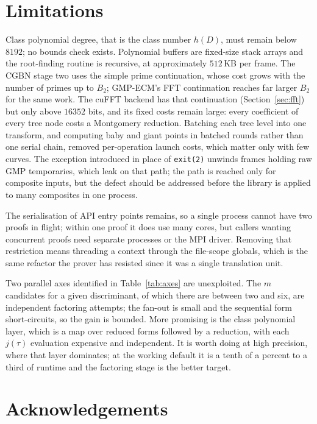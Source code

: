 \documentclass[11pt,a4paper]{article}
\newcommand{\code}[1]{\texttt{#1}}
\begin{document}
\section{Limitations}

Class polynomial degree, that is the class number $h(D)$, must remain
below $8192$; no bounds check exists. Polynomial buffers are fixed-size
stack arrays and the root-finding routine is recursive, at approximately
$512$\,KB per frame. The CGBN stage two uses the simple prime
continuation, whose cost grows with the number of primes up to $B_2$; GMP-ECM's FFT
continuation reaches far larger $B_2$ for the same work. The cuFFT backend has that
continuation (Section~\ref{sec:fft}) but only above $16352$ bits, and its fixed costs remain
large: every coefficient of every tree node costs a Montgomery reduction. Batching each tree
level into one transform, and computing baby and giant points in batched rounds rather than one
serial chain, removed per-operation launch costs, which matter only with few curves.
The exception introduced in
place of \code{exit(2)} unwinds frames holding raw GMP temporaries, which
leak on that path; the path is reached only for composite inputs, but the
defect should be addressed before the library is applied to many
composites in one process.

The serialisation of API entry points remains, so a single process cannot
have two proofs in flight; within one proof it does use many cores, but
callers wanting concurrent proofs need separate processes or the MPI
driver. Removing that restriction means threading a context through the
file-scope globals, which is the same refactor the prover has resisted
since it was a single translation unit.

Two parallel axes identified in Table~\ref{tab:axes} are unexploited.
The $m$ candidates for a given discriminant, of which there are between
two and six, are independent factoring attempts; the fan-out is small and
the sequential form short-circuits, so the gain is bounded. More
promising is the class polynomial layer, which is a map over reduced
forms followed by a reduction, with each $j(\tau)$ evaluation expensive
and independent. It is worth doing at high precision, where that layer
dominates; at the working default it is a tenth of a percent to a third
of runtime and the factoring stage is the better target.

\section*{Acknowledgements}
\end{document}
